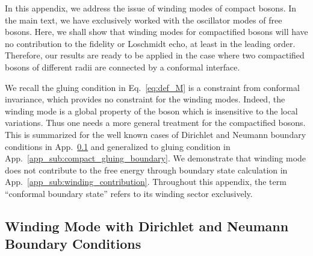 In this appendix, we address the issue of winding modes of compact bosons. In the main text, we have exclusively worked with the oscillator modes of free bosons. 
Here, we shall show that winding modes for compactified bosons will have no contribution to the fidelity or Loschmidt echo, at least in the leading order. Therefore, our results are ready to be applied in the case where two compactified bosons of different radii are connected by a conformal interface\cite{PhysRevLett.118.136801}. 

We recall the gluing condition in Eq.~\eqref{eq:def_M} is a constraint from conformal invariance\cite{blumenhagen_introduction_2009,bachas_permeable_2002}, which provides no constraint for the winding modes. Indeed, the winding mode is a global property of the boson which is insensitive to the local variations. Thus one needs a more general treatment for the compactified bosons. This is summarized for the well known cases of Dirichlet and Neumann boundary conditions in App.~\ref{app_sub:compact_DN_boundary} and generalized to gluing condition in App.~\ref{app_sub:compact_gluing_boundary}. We demonstrate that winding mode does not contribute to the free energy through boundary state calculation in App.~\ref{app_sub:winding_contribution}. Throughout this appendix, the term ``conformal boundary state'' refers to its winding sector exclusively.


\subsection{Winding Mode with Dirichlet and Neumann Boundary Conditions}
\label{app_sub:compact_DN_boundary}

